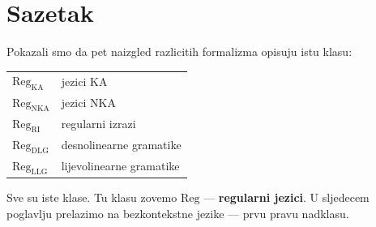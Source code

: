 \section*{Sazetak}

Pokazali smo da pet naizgled razlicitih formalizma opisuju istu klasu:

\medskip
\noindent
\begin{tabular}{ll}
  $\mathrm{Reg_{KA}}$ & jezici KA \\
  $\mathrm{Reg_{NKA}}$ & jezici NKA \\
  $\mathrm{Reg_{RI}}$ & regularni izrazi \\
  $\mathrm{Reg_{DLG}}$ & desnolinearne gramatike \\
  $\mathrm{Reg_{LLG}}$ & lijevolinearne gramatike \\
\end{tabular}

\medskip
Sve su iste klase. Tu klasu zovemo $\mathrm{Reg}$ --- \textbf{regularni
jezici}. U sljedecem poglavlju prelazimo na bezkontekstne jezike ---
prvu pravu nadklasu.

